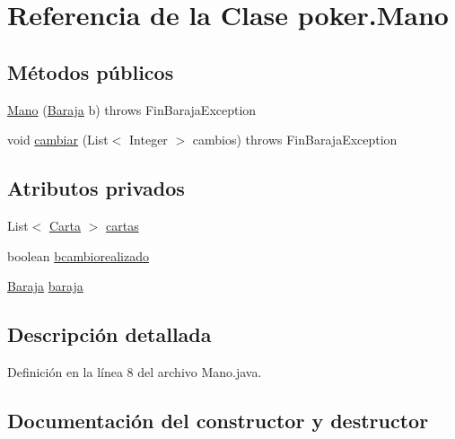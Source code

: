 \hypertarget{classpoker_1_1Mano}{}\section{Referencia de la Clase poker.\+Mano}
\label{classpoker_1_1Mano}
\subsection*{Métodos públicos}
\begin{DoxyCompactItemize}
\item 
\mbox{\hyperlink{classpoker_1_1Mano_ac89468d484812da476c2a46201eb513e}{Mano}} (\mbox{\hyperlink{classpoker_1_1Baraja}{Baraja}} b)  throws Fin\+Baraja\+Exception 
\item 
void \mbox{\hyperlink{classpoker_1_1Mano_a1f3e7289b85d98324d46a8afce171368}{cambiar}} (List$<$ Integer $>$ cambios)  throws Fin\+Baraja\+Exception
\end{DoxyCompactItemize}
\subsection*{Atributos privados}
\begin{DoxyCompactItemize}
\item 
List$<$ \mbox{\hyperlink{classpoker_1_1Carta}{Carta}} $>$ \mbox{\hyperlink{classpoker_1_1Mano_ae6e107ad79d163a4c45afc6274d36d9e}{cartas}}
\item 
boolean \mbox{\hyperlink{classpoker_1_1Mano_a65e1d2bb8d29cf88b105c39f26f5aa38}{bcambiorealizado}}
\item 
\mbox{\hyperlink{classpoker_1_1Baraja}{Baraja}} \mbox{\hyperlink{classpoker_1_1Mano_a9fd3c2334c2346b20e9e881b370fb564}{baraja}}
\end{DoxyCompactItemize}


\subsection{Descripción detallada}


Definición en la línea 8 del archivo Mano.\+java.



\subsection{Documentación del constructor y destructor}
\mbox{\label{classpoker_1_1Mano_ac89468d484812da476c2a46201eb513e}} 

